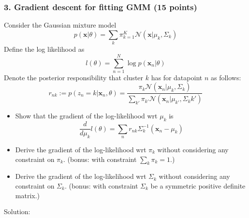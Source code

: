 \documentclass[12pt]{article}%
\begin{document}
\newpage


\subsubsection*{3. Gradient descent for fitting GMM (15 points)}
Consider the Gaussian mixture model
\[p(\mathbf{x}|\theta)=\sum_k \pi_{k=1}^K \mathcal{N}(\mathbf{x}|\mu_k,\Sigma_k)\]
Define the log likelihood as
\[ l(\theta) = \sum_{n=1}^N \log p(\mathbf{x}_n|\theta)
\]
Denote the posterior responsibility that cluster $k$ has for datapoint $n$ as follows:
\[
r_{nk}:=p(z_n=k|\mathbf{x}_n,\theta) = \frac{\pi_k\mathcal{N}(\mathbf{x}_n|\mu_k,\Sigma_k)}{\sum_{k'}\pi_{k'}\mathcal{N}(\mathbf{x}_n|\mu_{k'},\Sigma_k{k'})}
\]

\begin{itemize}
	
	\item Show that the gradient of the log-likelihood wrt $\mu_k$ is
	\[ \frac{d}{d\mu_k}l(\theta) = \sum_n r_{nk}\Sigma_k^{-1}(\mathbf{x}_n-\mu_k)
	\]
    \item Derive the gradient of the log-likelihood wrt $\pi_k$ without considering any constraint on $\pi_k$. (bonus: with constraint $\sum_k\pi_k=1$.)
    \item Derive the gradient of the log-likelihood wrt $\Sigma_k$ without considering any constraint on $\Sigma_k$. (bonus: with constraint $\Sigma_k$ be a symmetric positive definite matrix.) 
	
\end{itemize}
\par
Solution: \par

\newpage

\nocite{*} 


\end{document}
